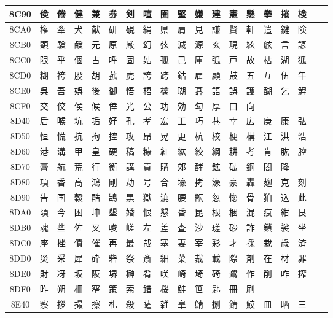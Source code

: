 \begin{table}[H]
\begin{tabular}{|Sc|*{16}{>{\centering\arraybackslash}p{1em}|}>{\centering\arraybackslash}p{2.5em}|}
8C90 & 倹 & 倦 & 健 & 兼 & 券 & 剣 & 喧 & 圏 & 堅 & 嫌 & 建 & 憲 & 懸 & 拳 & 捲 & 検 \\ \hline
8CA0 & 権 & 牽 & 犬 & 献 & 研 & 硯 & 絹 & 県 & 肩 & 見 & 謙 & 賢 & 軒 & 遣 & 鍵 & 険 \\ \hline
8CB0 & 顕 & 験 & 鹸 & 元 & 原 & 厳 & 幻 & 弦 & 減 & 源 & 玄 & 現 & 絃 & 舷 & 言 & 諺 \\ \hline
8CC0 & 限 & 乎 & 個 & 古 & 呼 & 固 & 姑 & 孤 & 己 & 庫 & 弧 & 戸 & 故 & 枯 & 湖 & 狐 \\ \hline
8CD0 & 糊 & 袴 & 股 & 胡 & 菰 & 虎 & 誇 & 跨 & 鈷 & 雇 & 顧 & 鼓 & 五 & 互 & 伍 & 午 \\ \hline
8CE0 & 呉 & 吾 & 娯 & 後 & 御 & 悟 & 梧 & 檎 & 瑚 & 碁 & 語 & 誤 & 護 & 醐 & 乞 & 鯉 \\ \hline
8CF0 & 交 & 佼 & 侯 & 候 & 倖 & 光 & 公 & 功 & 効 & 勾 & 厚 & 口 & 向 & & & \\ \hline
8D40 & 后 & 喉 & 坑 & 垢 & 好 & 孔 & 孝 & 宏 & 工 & 巧 & 巷 & 幸 & 広 & 庚 & 康 & 弘 \\ \hline
8D50 & 恒 & 慌 & 抗 & 拘 & 控 & 攻 & 昂 & 晃 & 更 & 杭 & 校 & 梗 & 構 & 江 & 洪 & 浩 \\ \hline
8D60 & 港 & 溝 & 甲 & 皇 & 硬 & 稿 & 糠 & 紅 & 紘 & 絞 & 綱 & 耕 & 考 & 肯 & 肱 & 腔 \\ \hline
8D70 & 膏 & 航 & 荒 & 行 & 衡 & 講 & 貢 & 購 & 郊 & 酵 & 鉱 & 砿 & 鋼 & 閤 & 降 & \\ \hline
8D80 & 項 & 香 & 高 & 鴻 & 剛 & 劫 & 号 & 合 & 壕 & 拷 & 濠 & 豪 & 轟 & 麹 & 克 & 刻 \\ \hline
8D90 & 告 & 国 & 穀 & 酷 & 鵠 & 黒 & 獄 & 漉 & 腰 & 甑 & 忽 & 惚 & 骨 & 狛 & 込 & 此 \\ \hline
8DA0 & 頃 & 今 & 困 & 坤 & 墾 & 婚 & 恨 & 懇 & 昏 & 昆 & 根 & 梱 & 混 & 痕 & 紺 & 艮 \\ \hline
8DB0 & 魂 & 些 & 佐 & 叉 & 唆 & 嵯 & 左 & 差 & 査 & 沙 & 瑳 & 砂 & 詐 & 鎖 & 裟 & 坐 \\ \hline
8DC0 & 座 & 挫 & 債 & 催 & 再 & 最 & 哉 & 塞 & 妻 & 宰 & 彩 & 才 & 採 & 栽 & 歳 & 済 \\ \hline
8DD0 & 災 & 采 & 犀 & 砕 & 砦 & 祭 & 斎 & 細 & 菜 & 裁 & 載 & 際 & 剤 & 在 & 材 & 罪 \\ \hline
8DE0 & 財 & 冴 & 坂 & 阪 & 堺 & 榊 & 肴 & 咲 & 崎 & 埼 & 碕 & 鷺 & 作 & 削 & 咋 & 搾 \\ \hline
8DF0 & 昨 & 朔 & 柵 & 窄 & 策 & 索 & 錯 & 桜 & 鮭 & 笹 & 匙 & 冊 & 刷 & & & \\ \hline
8E40 & 察 & 拶 & 撮 & 擦 & 札 & 殺 & 薩 & 雑 & 皐 & 鯖 & 捌 & 錆 & 鮫 & 皿 & 晒 & 三 \\ \hline

\end{tabular}
\end{table}
